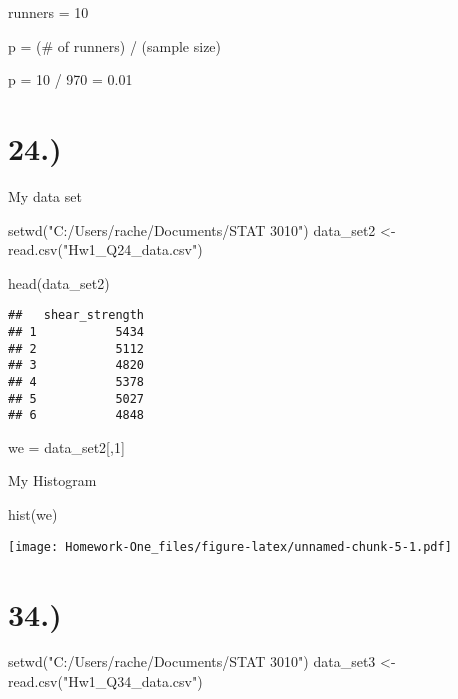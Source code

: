 \documentclass[
]{article}
\newenvironment{Shaded}{\begin{snugshade}}{\end{snugshade}}
\newcommand{\DecValTok}[1]{\textcolor[rgb]{0.00,0.00,0.81}{#1}}
\newcommand{\FunctionTok}[1]{\textcolor[rgb]{0.00,0.00,0.00}{#1}}
\newcommand{\NormalTok}[1]{#1}
\newcommand{\OtherTok}[1]{\textcolor[rgb]{0.56,0.35,0.01}{#1}}
\newcommand{\StringTok}[1]{\textcolor[rgb]{0.31,0.60,0.02}{#1}}
\begin{document}
runners = 10

p = (\# of runners) / (sample size)

p = 10 / 970 = 0.01

\hypertarget{section-1}{%
\section{24.)}\label{section-1}}

My data set

\begin{Shaded}
\begin{Highlighting}[]
\FunctionTok{setwd}\NormalTok{(}\StringTok{"C:/Users/rache/Documents/STAT 3010"}\NormalTok{)}
\NormalTok{data\_set2 }\OtherTok{\textless{}{-}} \FunctionTok{read.csv}\NormalTok{(}\StringTok{"Hw1\_Q24\_data.csv"}\NormalTok{)}

\FunctionTok{head}\NormalTok{(data\_set2)}
\end{Highlighting}
\end{Shaded}

\begin{verbatim}
##   shear_strength
## 1           5434
## 2           5112
## 3           4820
## 4           5378
## 5           5027
## 6           4848
\end{verbatim}

\begin{Shaded}
\begin{Highlighting}[]
\NormalTok{we }\OtherTok{=}\NormalTok{ data\_set2[,}\DecValTok{1}\NormalTok{]}
\end{Highlighting}
\end{Shaded}

My Histogram

\begin{Shaded}
\begin{Highlighting}[]
\FunctionTok{hist}\NormalTok{(we)}
\end{Highlighting}
\end{Shaded}

\texttt{[image: Homework-One\_files/figure-latex/unnamed-chunk-5-1.pdf]}

\hypertarget{section-2}{%
\section{34.)}\label{section-2}}

\begin{Shaded}
\begin{Highlighting}[]
\FunctionTok{setwd}\NormalTok{(}\StringTok{"C:/Users/rache/Documents/STAT 3010"}\NormalTok{)}
\NormalTok{data\_set3 }\OtherTok{\textless{}{-}} \FunctionTok{read.csv}\NormalTok{(}\StringTok{"Hw1\_Q34\_data.csv"}\NormalTok{)}
\end{Highlighting}
\end{Shaded}
\end{document}

